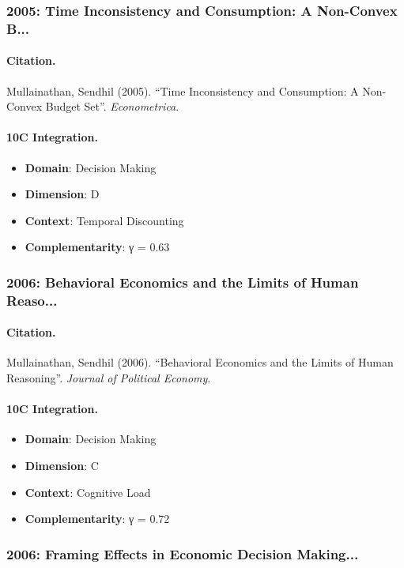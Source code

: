 \subsubsection{2005: Time Inconsistency and Consumption: A Non-Convex B...}

\paragraph{Citation.}
Mullainathan, Sendhil (2005). ``Time Inconsistency and Consumption: A Non-Convex Budget Set''. \textit{Econometrica}.

\paragraph{10C Integration.}
\begin{itemize}[nosep]
  \item \textbf{Domain}: Decision Making
  \item \textbf{Dimension}: D
  \item \textbf{Context}: Temporal Discounting
  \item \textbf{Complementarity}: γ = 0.63
\end{itemize}


\subsubsection{2006: Behavioral Economics and the Limits of Human Reaso...}

\paragraph{Citation.}
Mullainathan, Sendhil (2006). ``Behavioral Economics and the Limits of Human Reasoning''. \textit{Journal of Political Economy}.

\paragraph{10C Integration.}
\begin{itemize}[nosep]
  \item \textbf{Domain}: Decision Making
  \item \textbf{Dimension}: C
  \item \textbf{Context}: Cognitive Load
  \item \textbf{Complementarity}: γ = 0.72
\end{itemize}


\subsubsection{2006: Framing Effects in Economic Decision Making...}

